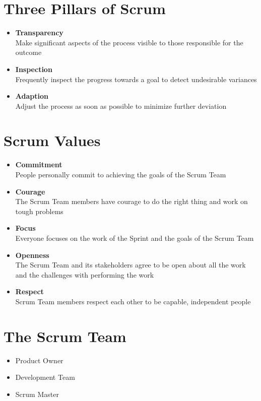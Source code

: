 \documentclass[a4paper,11pt,twocolumn]{article}
\begin{document}
\section*{Three Pillars of Scrum}
\begin{itemize}
	\item \textbf{Transparency}\\
	Make significant aspects of the process visible to those responsible for the outcome
	\item \textbf{Inspection}\\
	Frequently inspect the progress towards a goal to detect undesirable variances
	\item \textbf{Adaption}\\
	Adjust the process as soon as possible to minimize further deviation
\end{itemize}

\section*{Scrum Values}
\begin{itemize}
    \item \textbf{Commitment}\\
    People personally commit to achieving the goals of the Scrum Team
    \item \textbf{Courage}\\
    The Scrum Team members have courage to do the right thing and work on tough problems
    \item \textbf{Focus}\\
    Everyone focuses on the work of the Sprint and the goals of the Scrum Team
    \item \textbf{Openness}\\
    The Scrum Team and its stakeholders agree to be open about all the work and the challenges with performing the work
    \item \textbf{Respect}\\
    Scrum Team members respect each other to be capable, independent people
\end{itemize}

\section*{The Scrum Team}
\begin{itemize}
    \item Product Owner
    \item Development Team
    \item Scrum Master
\end{itemize}
\end{document}

